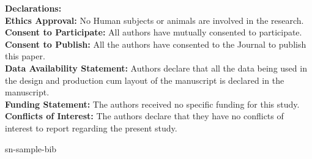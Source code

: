 \documentclass[sn-mathphys]{sn-jnl}%
\theoremstyle{thmstyleone}%
\theoremstyle{thmstyletwo}%
\theoremstyle{thmstylethree}%
\begin{document}
\noindent
\textbf{Declarations:}\\
\textbf{Ethics Approval:} No Human subjects or animals are involved in the research.\\
\textbf{Consent to Participate:} All authors have mutually consented to participate.\\
\textbf{Consent to Publish:} All the authors have consented to the Journal to publish this paper. \\
\textbf{Data Availability Statement:} Authors declare that all the data being used in the design and production cum layout of the manuscript is declared in the manuscript. \\
\textbf{Funding Statement:} The authors received no specific funding for this study.\\
\textbf{Conflicts of Interest:} The authors declare that they have no conflicts of interest to report regarding the present study.




 {sn-sample-bib}
\end{document}
